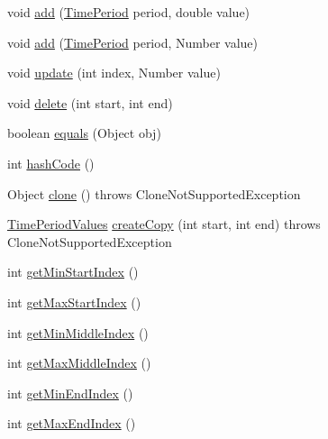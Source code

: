 \begin{DoxyCompactItemize}
\item 
void \mbox{\hyperlink{classorg_1_1jfree_1_1data_1_1time_1_1_time_period_values_aa9ecd642487ea692e048e6d0fbc3fc47}{add}} (\mbox{\hyperlink{interfaceorg_1_1jfree_1_1data_1_1time_1_1_time_period}{Time\+Period}} period, double value)
\item 
void \mbox{\hyperlink{classorg_1_1jfree_1_1data_1_1time_1_1_time_period_values_a8adea7222bf714a1e8862b973bb381e4}{add}} (\mbox{\hyperlink{interfaceorg_1_1jfree_1_1data_1_1time_1_1_time_period}{Time\+Period}} period, Number value)
\item 
void \mbox{\hyperlink{classorg_1_1jfree_1_1data_1_1time_1_1_time_period_values_a96e95a2c4faf28624e3288fdeb9e86a2}{update}} (int index, Number value)
\item 
void \mbox{\hyperlink{classorg_1_1jfree_1_1data_1_1time_1_1_time_period_values_a5a54b76ab3c0a09c6744afadf13b9e2e}{delete}} (int start, int end)
\item 
boolean \mbox{\hyperlink{classorg_1_1jfree_1_1data_1_1time_1_1_time_period_values_ab3611807c571e4effa525440ae81501f}{equals}} (Object obj)
\item 
int \mbox{\hyperlink{classorg_1_1jfree_1_1data_1_1time_1_1_time_period_values_a9aa9b0655bbbf7e53c9e76c33c7c56a3}{hash\+Code}} ()
\item 
Object \mbox{\hyperlink{classorg_1_1jfree_1_1data_1_1time_1_1_time_period_values_aca2830b9dd4583e26362fe7ac7e1a107}{clone}} ()  throws Clone\+Not\+Supported\+Exception 
\item 
\mbox{\hyperlink{classorg_1_1jfree_1_1data_1_1time_1_1_time_period_values}{Time\+Period\+Values}} \mbox{\hyperlink{classorg_1_1jfree_1_1data_1_1time_1_1_time_period_values_ac8ac587986692f14e663155e22154f4e}{create\+Copy}} (int start, int end)  throws Clone\+Not\+Supported\+Exception 
\item 
int \mbox{\hyperlink{classorg_1_1jfree_1_1data_1_1time_1_1_time_period_values_ae8c9c7364f15f9fd1dfd60f172479bb3}{get\+Min\+Start\+Index}} ()
\item 
int \mbox{\hyperlink{classorg_1_1jfree_1_1data_1_1time_1_1_time_period_values_af6ceb454371db07204c2e91304a6793c}{get\+Max\+Start\+Index}} ()
\item 
int \mbox{\hyperlink{classorg_1_1jfree_1_1data_1_1time_1_1_time_period_values_af0e382db88a3ad60738e595874596d02}{get\+Min\+Middle\+Index}} ()
\item 
int \mbox{\hyperlink{classorg_1_1jfree_1_1data_1_1time_1_1_time_period_values_a2c17360a02e242be58d9238b5e482f68}{get\+Max\+Middle\+Index}} ()
\item 
int \mbox{\hyperlink{classorg_1_1jfree_1_1data_1_1time_1_1_time_period_values_ae1505f47d9c5db9a1bf777a5cd1fccad}{get\+Min\+End\+Index}} ()
\item 
int \mbox{\hyperlink{classorg_1_1jfree_1_1data_1_1time_1_1_time_period_values_a32458e119c457b18c42daa124ca06fa9}{get\+Max\+End\+Index}} ()
\end{DoxyCompactItemize}
